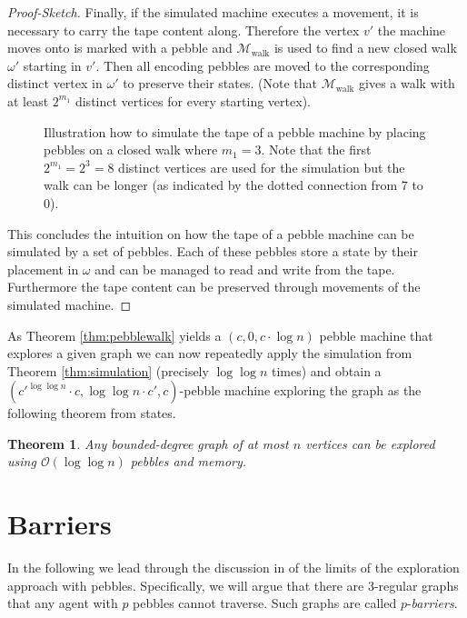\documentclass[oneside]{scrartcl}
\newtheorem{thm}{Theorem}
\begin{document}
\begin{proof}[Proof-Sketch]
  Finally, if the simulated machine executes a movement, it is necessary to
  carry the tape content along. Therefore the vertex $v'$ the machine moves
  onto is marked with a pebble and $\mathcal{M}_{\text{walk}}$ is used to find
  a new closed walk $\omega'$ starting in $v'$. Then all encoding pebbles are
  moved to the corresponding distinct vertex in $\omega'$ to preserve their
  states. (Note that $\mathcal{M}_{\text{walk}}$ gives a walk with at least
  $2^{m_{1}}$ distinct vertices for every starting vertex).
  \begin{figure}
    \begin{center}
      \resizebox{0.6\textwidth}{!}{}
    \end{center}
    \caption{Illustration how to simulate the tape of a pebble machine by
      placing pebbles on a closed walk where $m_{1} = 3$. Note that the first
      $2^{m_{1}}=2^{3}=8$ distinct vertices are used for the simulation but the
    walk can be longer (as indicated by the dotted connection from $7$ to $0$).
  }
    \label{fig:tapesim}
  \end{figure}
  This concludes the intuition on how the tape of a pebble machine can be
  simulated by a set of pebbles. Each of these pebbles store a state by their
  placement in $\omega$ and can be managed to read and write from the tape.
  Furthermore the tape content can be preserved through movements of the
  simulated machine.
\end{proof}

As Theorem \ref{thm:pebblewalk} yields a $(c,0,c\cdot\log n)$ pebble machine
that explores a given graph we can now repeatedly apply the simulation
from Theorem \ref{thm:simulation} (precisely $\log\log n$ times) and obtain
a $(c'^{\log\log n}\cdot c, \log\log n\cdot c', c)$-pebble machine exploring
the graph as the following theorem from \cite{pebbles} states.
\begin{thm}
  Any bounded-degree graph of at most $n$ vertices can be explored using
  $\mathcal{O}(\log \log n)$ pebbles and memory.
\end{thm}

\section{Barriers}
In the following we lead through the discussion in \cite{pebbles} of the limits
of the exploration approach with pebbles. Specifically, we will argue that
there are 3-regular graphs that any agent with $p$ pebbles cannot traverse.
Such graphs are called $p$-\emph{barriers}.
\end{document}
